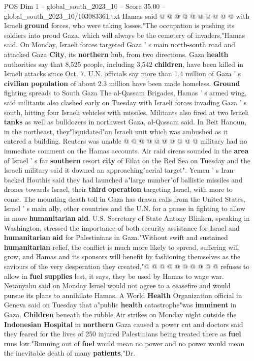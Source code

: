 \begin{textsample}{POS Dim 1 – global\_south\_2023\_10 – Score 35.00 – global\_south\_2023\_10/103083361.txt}
Hamas said @ @ @ @ @ @ @ @ @ @ with Israeli \textbf{ground} forces, who were taking losses."The occupation is pushing its soldiers into proud Gaza, which will always be the cemetery of invaders,"Hamas said.
On Monday, Israeli forces targeted Gaza ' s main north-south road and attacked Gaza \textbf{City}, its \textbf{northern} hub, from two directions.
Gaza \textbf{health} authorities say that 8,525 people, including 3,542 \textbf{children}, have been killed in Israeli attacks since Oct. 7.
U.N. officials say more than 1.4 million of Gaza ' s \textbf{civilian} \textbf{population} of about 2.3 million have been made homeless. \textbf{Ground} fighting spreads to South Gaza The al-Qassam Brigades, Hamas ' s armed wing, said militants also clashed early on Tuesday with Israeli forces invading Gaza ' s south, hitting four Israeli vehicles with missiles.
Militants also fired at two Israeli \textbf{tanks} as well as bulldozers in northwest Gaza, al-Qassam said.
In Beit Hanoun, in the northeast, they"liquidated"an Israeli unit which was ambushed as it entered a building.
Reuters was unable @ @ @ @ @ @ @ @ @ @ military had no immediate comment on the Hamas accounts.
Air raid sirens sounded in the \textbf{area} of Israel ' s far \textbf{southern} resort \textbf{city} of Eilat on the Red Sea on Tuesday and the Israeli military said it downed an approaching"aerial target".
Yemen ' s Iran-backed Houthis said they had launched a"large number"of ballistic missiles and drones towards Israel, their \textbf{third} \textbf{operation} targeting Israel, with more to come.
The mounting death toll in Gaza has drawn calls from the United States, Israel ' s main ally, other countries and the U.N. for a pause in fighting to allow in more \textbf{humanitarian} \textbf{aid}.
U.S.
Secretary of State Antony Blinken, speaking in Washington, stressed the importance of both security assistance for Israel and \textbf{humanitarian} \textbf{aid} for Palestinians in Gaza."Without swift and sustained \textbf{humanitarian} relief, the conflict is much more likely to spread, suffering will grow, and Hamas and its sponsors will benefit by fashioning themselves as the saviours of the very desperation they created,"@ @ @ @ @ @ @ @ @ @ refuses to allow in \textbf{fuel} \textbf{supplies} lest, it says, they be used by Hamas to wage war.
Netanyahu said on Monday Israel would not agree to a ceasefire and would pursue its plans to annihilate Hamas.
A World \textbf{Health} Organization official in Geneva said on Tuesday that a"public \textbf{health} catastrophe"was \textbf{imminent} in Gaza. \textbf{Children} beneath the rubble Air strikes on Monday night outside the \textbf{Indonesian} \textbf{Hospital} in \textbf{northern} Gaza caused a power cut and doctors said they feared for the lives of 250 injured Palestinians being treated there as \textbf{fuel} runs low."Running out of \textbf{fuel} would mean no power and no power would mean the inevitable death of many \textbf{patients},"Dr.

\end{textsample}
